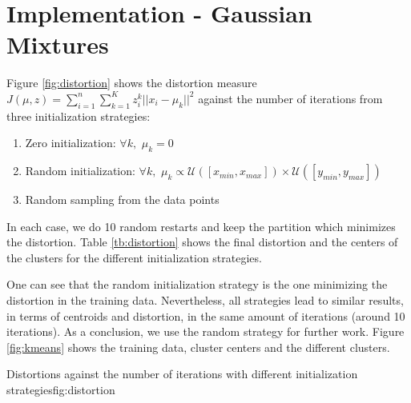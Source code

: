 \documentclass{article}
\begin{document}

\section{Implementation - Gaussian Mixtures}


Figure \ref{fig:distortion} shows the distortion measure $J(\mu, z) = \sum_{i=1}^n \sum_{k=1}^K z_i^k ||x_i - \mu_k||^2$ against the number of iterations from three initialization strategies:
\begin{enumerate}
\item Zero initialization: $\forall k,\,\, \mu_k = 0$
\item Random initialization: $\forall k,\,\, \mu_k \propto \mathcal{U}([x_{min}, x_{max}])\times \mathcal{U}([y_{min}, y_{max}])$
\item Random sampling from the data points
\end{enumerate}
In each case, we do 10 random restarts and keep the partition which minimizes the distortion. Table \ref{tb:distortion} shows the final distortion and the centers of the clusters for the different initialization strategies.

One can see that the random initialization strategy is the one minimizing the distortion in the training data. Nevertheless, all strategies lead to similar results, in terms of centroids and distortion, in the same amount of iterations (around 10 iterations). As a conclusion, we use the random strategy for further work. Figure \ref{fig:kmeans} shows the training data, cluster centers and the different clusters.

          {}
          {}
          {Distortions against the number of iterations with different initialization strategies}{fig:distortion}
          
\end{document}
